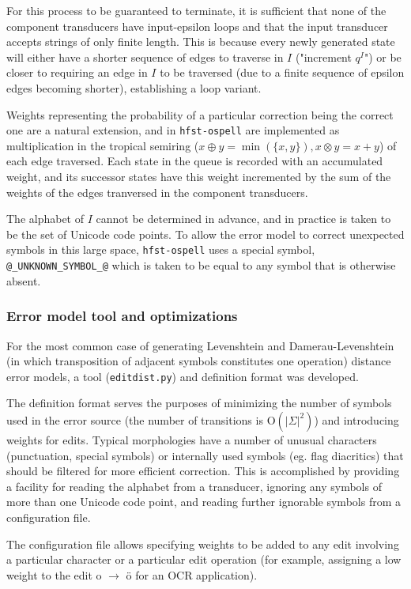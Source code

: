 \documentclass{llncs}
\begin{document}
For this process to be guaranteed to terminate, it is sufficient that none of
the component transducers have input-epsilon loops and that the input
transducer accepts strings of only finite length. This is because every newly
generated state will either have a shorter sequence of edges to traverse in
$I$ ("increment $q^I$") or be closer to requiring an edge in $I$ to be traversed
(due to a finite sequence of epsilon edges becoming shorter), establishing a
loop variant.

Weights representing the probability of a particular correction being the
correct one are a natural extension, and in \verb!hfst-ospell! are implemented
as multiplication in the tropical semiring
($x \oplus y = \min(\{x, y\}), x \otimes y = x + y$) of each edge traversed.
Each state in the queue is recorded with an accumulated weight, and its
successor states have this weight incremented by the sum of the weights of
the edges tranversed in the component transducers.

The alphabet of $I$ cannot be determined in advance, and in practice is taken
to be the set of Unicode code points. To allow the error model to correct
unexpected symbols in this large space, \verb!hfst-ospell! uses a special
symbol, \verb!@_UNKNOWN_SYMBOL_@! which is taken to be equal to any symbol
that is otherwise absent.

\subsubsection{Error model tool and optimizations}
For the most common case of generating Levenshtein and
Damerau-Levenshtein (in which transposition of adjacent symbols constitutes
one operation) distance error models, a tool (\verb!editdist.py!) and
definition format was developed.

The definition format serves the purposes of minimizing the number of symbols
used in the error source (the number of transitions is $\mathrm{O}(|\Sigma|^2)$)
and introducing weights for edits. Typical
morphologies have a number of unusual characters (punctuation, special symbols)
or internally used symbols (eg. flag diacritics) that should be filtered for
more efficient correction. This is accomplished by providing a facility for
reading the alphabet from a transducer, ignoring any symbols of more than
one Unicode code point, and reading further ignorable symbols from a
configuration file.

The configuration file allows specifying weights to be added to any edit
involving a particular character or a particular edit operation (for example,
assigning a low weight to the edit o $\rightarrow$ ö for an OCR application).
\end{document}
